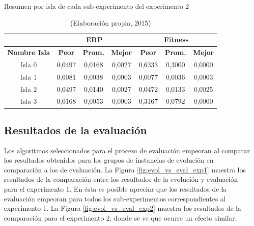 \begin{table}[hbtp!]
\caption{Resumen por isla de cada sub-experimento del experimento 2}\label{tab:resumen_mejores_islas_pm01}
\small
\centering
\begin{center}
\begin{tabular}{c|ccc|ccc}
{\textbf{}} & \multicolumn{3}{c|}{{\textbf{ERP}}} & \multicolumn{3}{c}{{\textbf{Fitness}}} \\ \hline
{\textbf{Nombre Isla}} & {\textbf{Peor}} & {\textbf{Prom.}} & {\textbf{Mejor}} & {\textbf{Peor}} & {\textbf{Prom.}} & {\textbf{Mejor}}\\ \hline
Isla 0 & 0,0497 & 0,0168 & 0,0027 & 0,6333 & 0,3000 & 0,0000 \\
Isla 1 & 0,0081 & 0,0038 & 0,0003 & 0,0077 & 0,0036 & 0,0003 \\
Isla 2 & 0,0497 & 0,0140 & 0,0027 & 0,0472 & 0,0133 & 0,0025 \\
Isla 3 & 0,0168 & 0,0053 & 0,0003 & 0,3167 & 0,0792 & 0,0000 \\
\hline
\end{tabular}
\end{center}
\caption*{(Elaboración propia, 2015)}
\end{table}

\subsection{Resultados de la evaluación}

Los algoritmos seleccionados para el proceso de evaluación empeoran al comparar los resultados obtenidos para los grupos de instancias de evolución en comparación a los de evaluación. La Figura \ref{fig:evol_vs_eval_exp1} muestra los resultados de la comparación entre los resultados de la evolución y evaluación para el experimento 1. En ésta es posible apreciar que los resultados de la evaluación empeoran para todos los sub-experimentos correspondientes al experimento 1. La Figura \ref{fig:evol_vs_eval_exp2} muestra los resultados de la comparación para el experimento 2, donde se ve que ocurre un efecto similar.

